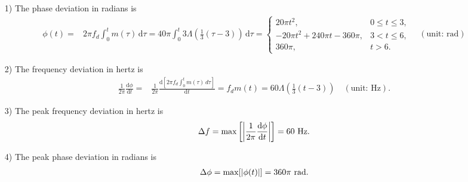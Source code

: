 \documentclass{assignment}
\begin{document}
\begin{sol}
    \begin{itemize}
        \item[1)] The phase deviation in radians is
        \begin{align}
            \phi(t)=&2\pi f_d\int_0^tm(\tau)\,\mathrm{d}\tau=40\pi\int_0^t3\Lambda\left(\frac{1}{3}(\tau-3)\right)\,\mathrm{d}\tau=\left\{\begin{array}{ll}
                20\pi t^2,&0\leq t\leq 3,\\
                -20\pi t^2+240\pi t-360\pi,&3<t\leq 6,\\
                360\pi,&t>6.
            \end{array}\right.\quad(\text{unit: rad})
        \end{align}
        \item[2)] The frequency deviation in hertz is
        \begin{align}
            \frac{1}{2\pi}\frac{\mathrm{d}\phi}{\mathrm{d}t}=&\frac{1}{2\pi}\frac{\mathrm{d}\left[2\pi f_d\int_0^tm(\tau)\,d\tau\right]}{\mathrm{d}t}=f_dm(t)=60\Lambda\left(\frac{1}{3}(t-3)\right)\quad(\text{unit: Hz}).
        \end{align}
        \item[3)] The peak frequency deviation in hertz is
        \begin{align}
            \Delta f=\max\left[\left\lvert\frac{1}{2\pi}\frac{\mathrm{d}\phi}{\mathrm{d}t}\right\rvert\right]=60\text{ Hz}.
        \end{align}
        \item[4)] The peak phase deviation in radians is
        \begin{align}
            \Delta\phi=\max[\left\lvert\phi(t)\right\rvert]=360\pi\text{ rad}.
        \end{align}
    \end{itemize}
\end{sol}
\end{document}
